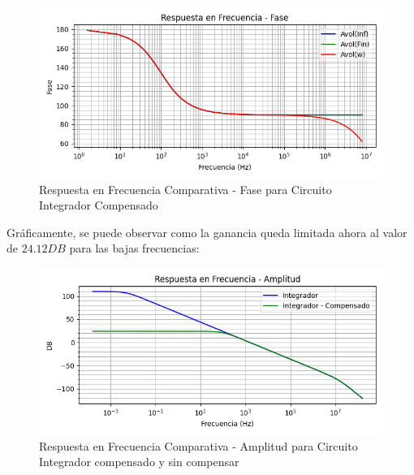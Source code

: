\begin{figure}[H]
    \centering 
    \includegraphics [scale=1] {../Ejercicio3-CircuitoIntegradoresyDerivadores/Imagenes/diagrama-bode-integrador-compensado-fase.png} 
    \caption{Respuesta en Frecuencia Comparativa - Fase para Circuito Integrador Compensado }
    \label{fig:emptyPlotTool}
\end{figure}

Gráficamente, se puede observar como la ganancia queda limitada ahora al valor de $24.12DB$ para las bajas frecuencias:

\begin{figure}[H]
    \centering 
    \includegraphics [scale=1] {../Ejercicio3-CircuitoIntegradoresyDerivadores/Imagenes/diagrama-bode-integrador-compensado-comparativo-amplitud.png} 
    \caption{Respuesta en Frecuencia Comparativa - Amplitud para Circuito Integrador compensado y sin compensar}
    \label{fig:emptyPlotTool}
\end{figure}

